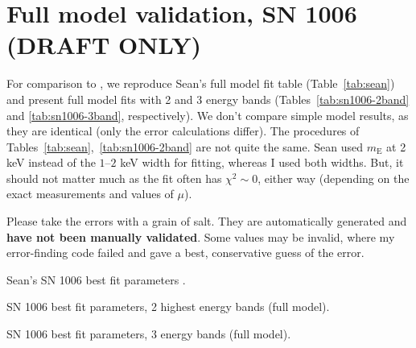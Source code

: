 \documentclass[iop, apj, numberedappendix, twocolappendix]{emulateapj}
\newcommand*{\mt}{\mathrm}
\newcommand*{\mE}{m_\mt{E}}
\begin{document}
\section{Full model validation, SN 1006 (DRAFT ONLY)}

For comparison to , we reproduce Sean's full model fit
table (Table~\ref{tab:sean}) and present full model fits with 2 and 3 energy
bands (Tables~\ref{tab:sn1006-2band} and \ref{tab:sn1006-3band}, respectively).
We don't compare simple model results, as they are identical (only the error
calculations differ).
The procedures of Tables~\ref{tab:sean},~\ref{tab:sn1006-2band} are not quite
the same.  Sean used $\mE$ at 2 keV instead of the $1$--$2$ keV width for
fitting, whereas I used both widths.  But, it should not matter much as
the fit often has $\chi^2 \sim 0$, either way (depending on the exact
measurements and values of $\mu$).

Please take the errors with a grain of salt.  They are automatically
generated and \textbf{have not been manually validated}.  Some values may be
invalid, where my error-finding code failed and gave a best, conservative guess
of the error.

\begin{table}[ht]
    \tiny
    \centering
    \caption{Sean's SN 1006 best fit parameters .
    \label{tab:sean}}
    
\end{table}

\begin{table*}[ht]
    \scriptsize
    \centering
    \caption{SN 1006 best fit parameters, 2 highest energy bands (full model).
    \label{tab:sn1006-2band}}
    
\end{table*}

\begin{table*}[ht]
    \scriptsize
    \centering
    \caption{SN 1006 best fit parameters, 3 energy bands (full model).
    \label{tab:sn1006-3band}}
    
\end{table*}


\end{document}
